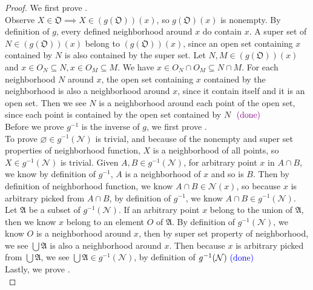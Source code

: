 \documentclass{report}
\begin{document}
\begin{proof}
  We first prove .\\

Observe $X \in \mathfrak{O}\implies X\in (g(\mathfrak{O}))(x)$, so $g(\mathfrak{O})(x)$ is nonempty. By definition of $g$, every defined neighborhood around $x$ do contain  $x$. A super set of $N\in (g(\mathfrak{O}))(x)$ belong to $(g(\mathfrak{O}))(x)$, since an open set containing $x$ contained by  $N$ is also contained by the super set. Let $N,M \in (g(\mathfrak{O}))(x)$ and $x \in O_N \subseteq N, x\in O_M \subseteq M$. We have $x \in O_N\cap O_M\subseteq N\cap M$. For each neighborhood $N$ around $x$, the open set containing  $x$ contained by the neighborhood is also a neighborhood around  $x$, since it contain itself and it is an open set.  Then we see $N$ is a neighborhood around each point of the open set, since each point is contained by the open set contained by $N$ $\textcolor{violet}{\text{ (done) }}$\\

Before we prove $g^{-1}$ is the inverse of $g$, we first prove  .\\


To prove $\varnothing \in g^{-1}(\mathcal{N})$ is trivial, and because of the nonempty and super set properties of neighborhood function, $X$ is a neighborhood of all points, so  $X\in g^{-1}(\mathcal{N})$ is trivial. Given $A,B\in g^{-1}(\mathcal{N})$, for arbitrary point $x$ in $A\cap B$, we know by definition of $g^{-1}$,  $A$ is a neighborhood of  $x$ and so is  $B$. Then by definition of neighborhood function, we know $A\cap B\in \mathcal{N}(x)$, so because $x$ is arbitrary picked from $A\cap B$, by definition of $g^{-1}$,  we know $A\cap B\in g^{-1}(\mathcal{N})$. Let $\mathfrak{A}$ be a subset of $g^{-1}(\mathcal{N})$. If an arbitrary point $x$ belong to the union of $\mathfrak{A}$, then we know $x$ belong to an element $O$ of  $\mathfrak{A}$. By definition of $g^{-1}(\mathcal{N})$, we know $O$ is a neighborhood around  $x$, then by super set property of neighborhood, we see  $\bigcup \mathfrak{A}$ is also a neighborhood around $x$. Then because $x$ is arbitrary picked from $\bigcup \mathfrak{A}$, we see  $\bigcup \mathfrak{A}\in g^{-1}(\mathcal{N})$, by definition of $g^{-1}(\mathcal{N})\textcolor{blue}{\text{ (done) }}$\\

Lastly, we prove .\\


\end{proof}
\end{document}
